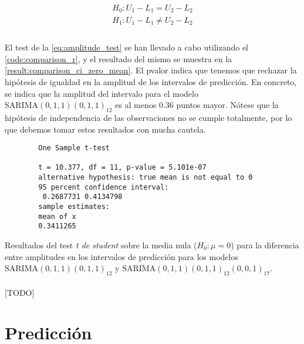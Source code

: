 \documentclass[a4paper, spanish]{article}
\begin{document}
    \begin{equation}
    \label{eq:amplitude_test}
      \begin{split}
        H_0: U_1 - L_1 = U_2 - L_2 \\
        H_1: U_1 - L_1 \neq U_2 - L_2 \\
      \end{split}
    \end{equation}

    \paragraph{}
    El test de la \autoref{eq:amplitude_test} se han llevado a cabo utilizando el \autoref{code:comparison_r}, y el resultado del mismo se muestra en la \autoref{result:comparison_ci_zero_mean}. El pvalor indica que tenemos que rechazar la hipótesis de igualdad en la amplitud de los intervalos de predicción. En concreto, se indica que la amplitud del intervalo para el modelo $\text{SARIMA}(0, 1, 1)(0, 1, 1)_{12}$ es al menos $0.36$ puntos mayor. Nótese que la hipótesis de independencia de las observaciones no se cumple totalmente, por lo que debemos tomar estos resultados con mucha cautela.

    \begin{table}
      \begin{Verbatim}
        One Sample t-test

        t = 10.377, df = 11, p-value = 5.101e-07
        alternative hypothesis: true mean is not equal to 0
        95 percent confidence interval:
         0.2687731 0.4134798
        sample estimates:
        mean of x
        0.3411265
      \end{Verbatim}
      \caption{Resultados del test \emph{t de student} sobre la media nula ($H_0: \mu = 0$) para la diferencia entre amplitudes en los intervalos de predicción para los modelos $\text{SARIMA}(0, 1, 1)(0, 1, 1)_{12}$ y $\text{SARIMA}(0, 1, 1)(0, 1, 1)_{12}(0, 0, 1)_{17}$.}
      \label{result:comparison_ci_zero_mean}
    \end{table}

    \paragraph{}
    [TODO]

  \section{Predicción}
  \label{sec:prediction}
\end{document}
